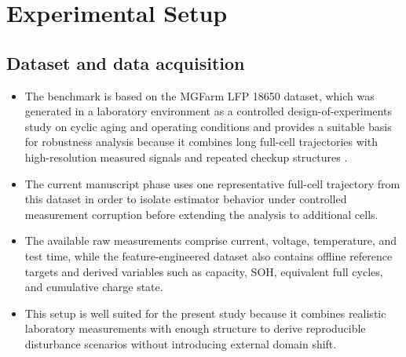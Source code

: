 \documentclass[review,nopreprintline]{elsarticle}
\begin{document}
\section{Experimental Setup}
\subsection{Dataset and data acquisition}
\begin{itemize}[leftmargin=*]
    \item The benchmark is based on the MGFarm LFP 18650 dataset, which was generated in a laboratory environment as a controlled design-of-experiments study on cyclic aging and operating conditions and provides a suitable basis for robustness analysis because it combines long full-cell trajectories with high-resolution measured signals and repeated checkup structures \cite{aqachtoulMGFARMIoTEdgeDriven2026,LFP_DoE_Cycle_Aging_Dataset,siebertzStatistischeVersuchsplanung2017}.
    \item The current manuscript phase uses one representative full-cell trajectory from this dataset in order to isolate estimator behavior under controlled measurement corruption before extending the analysis to additional cells.
    \item The available raw measurements comprise current, voltage, temperature, and test time, while the feature-engineered dataset also contains offline reference targets and derived variables such as capacity, SOH, equivalent full cycles, and cumulative charge state.
    \item This setup is well suited for the present study because it combines realistic laboratory measurements with enough structure to derive reproducible disturbance scenarios without introducing external domain shift.
\end{itemize}
\end{document}
